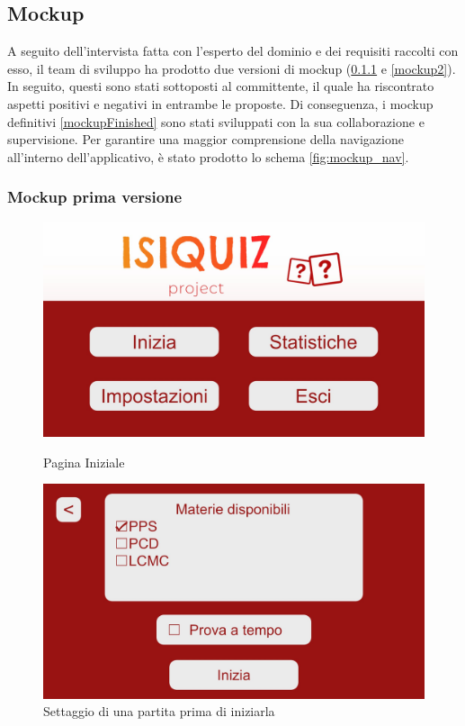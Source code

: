         \subsection{Mockup}
    	A seguito dell'intervista fatta con l'esperto del dominio e dei requisiti raccolti con esso, il team di sviluppo ha prodotto due versioni di mockup (\ref{mockup1} e \ref{mockup2}). In seguito, questi sono stati sottoposti al committente, il quale ha riscontrato aspetti positivi e negativi in entrambe le proposte. Di conseguenza, i mockup definitivi \ref{mockupFinished} sono stati sviluppati con la sua collaborazione e supervisione. Per garantire una maggior comprensione della navigazione all'interno dell'applicativo, è stato prodotto lo schema \ref{fig:mockup_nav}.
     
        \subsubsection{Mockup prima versione}\label{mockup1}
        
        \begin{figure}[H]
          \centering
          \begin{minipage}[b]{0.48\textwidth}
            \includegraphics[width=\textwidth]{Images/mockup/home1.jpg}
            \caption{Pagina Iniziale}
            \label{fig:HomePage1}
          \end{minipage}
          \hfill
          \begin{minipage}[b]{0.48\textwidth}
            \includegraphics[width=\textwidth]{Images/mockup/start1.jpg}
            \caption{Settaggio di una partita prima di iniziarla}
            \label{fig:Start1}
          \end{minipage}
        \end{figure}

